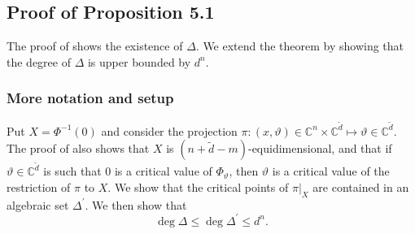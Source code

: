 \documentclass[sigconf]{acmart}
\def\C{\mathbb{C}}
\def\vt{\vartheta}
\def\dt{\widetilde{d}}
\begin{document}
\subsection{Proof of Proposition 5.1}
% 
The proof of \cite[Theorem B.3]{TWT} shows the existence of $\Delta.$ We extend the theorem by showing that the degree of $\Delta$ is upper bounded by $d^n.$ 
\subsubsection{More notation and setup}
Put $X = \Phi^{-1}(0)$ and consider the projection $\pi:(x, \vt) \in \C^n \times \C^{\dt} \mapsto \vt \in\C^{\dt}$. The proof of \cite[Theorem B.3]{NO} also shows that $X$ is $(n+ \dt -m)$-equidimensional, and that if $\vt \in \C^{\dt}$
is such that $0$ is a critical value of $\Phi_{\vt}$, then $\vt$ is a critical value of the restriction of $\pi$ to $X.$ We show that the critical points of $\pi|_X$ are contained in an algebraic set
$\Delta^{'}$. We then show that 
\[\deg \Delta \leq \deg \Delta^{'} \leq d^n.
\] 
%
\end{document}
